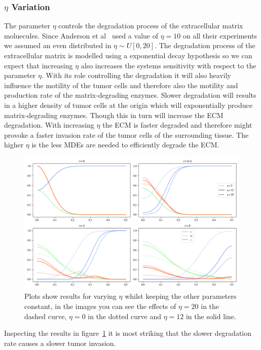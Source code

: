 \subsubsection*{$\eta$ Variation}
The parameter $\eta$ controls the degradation process of the extracellular matrix moluecules. Since Anderson et al~\cite{anderson_mathematical_2000} used a value of $\eta=10$ on all their experiments we assumed an even distributed in $\eta \sim U[0, 20]$. The degradation process of the extracellular matrix is modelled using a exponential decay hypothesis so we can expect that increasing $\eta$ also increases the systems sensitivity with respect to the parameter $\eta$. With its role controlling the degradation it will also heavily influence the motility of the tumor cells and therefore also the motility and production rate of the matrix-degrading enzymes. Slower degradation will results in a higher density of tumor cells at the origin which will exponentially produce matrix-degrading enzymes. Though this in turn will increase the ECM degradation. With increasing $\eta$ the ECM is faster degraded and therefore might provoke a faster invasion rate of the tumor cells of the surrounding tissue. The higher $\eta$ is the less MDEs are needed to efficiently degrade the ECM.\newline
\begin{figure}[h!]
    \centering
    \includegraphics[width=\textwidth]{resources/images/eta_variation.png}
    \caption{Plots show results for varying $\eta$ whilst keeping the other parameters constant, in the images you can see the effects of $\eta=20$ in the dashed curve, $\eta=0$ in the dotted curve and $\eta=12$ in the solid line.}
    \label{fig:eta_variation}
\end{figure}
Inspecting the results in figure~\ref{fig:eta_variation} it is most striking that the slower degradation rate causes a slower tumor invasion. \newline
